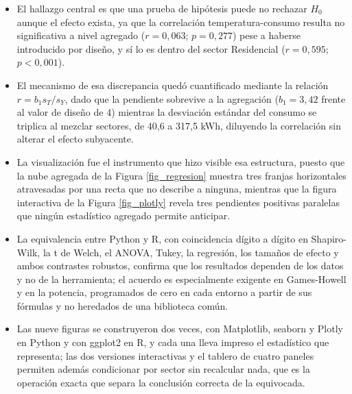 \begin{itemize}
        \vspace{10pt}

        \item El hallazgo central es que una prueba de hipótesis puede no rechazar
        $H_0$ aunque el efecto exista, ya que la correlación temperatura-consumo
        resulta no significativa a nivel agregado ($r = 0{,}063$; $p = 0{,}277$)
        pese a haberse introducido por diseño, y sí lo es dentro del sector
        Residencial ($r = 0{,}595$; $p < 0{,}001$).

        \vspace{10pt}

        \item El mecanismo de esa discrepancia quedó cuantificado mediante la
        relación $r = b_1 s_T / s_Y$, dado que la pendiente sobrevive a la
        agregación ($b_1 = 3{,}42$ frente al valor de diseño de 4) mientras la
        desviación estándar del consumo se triplica al mezclar sectores, de 40,6 a
        317,5 kWh, diluyendo la correlación sin alterar el efecto subyacente.

        \vspace{10pt}

        \item La visualización fue el instrumento que hizo visible esa estructura,
        puesto que la nube agregada de la Figura \ref{fig_regresion} muestra tres
        franjas horizontales atravesadas por una recta que no describe a ninguna,
        mientras que la figura interactiva de la Figura \ref{fig_plotly} revela tres
        pendientes positivas paralelas que ningún estadístico agregado permite
        anticipar.

        \vspace{10pt}

        \item La equivalencia entre Python y R, con coincidencia dígito a dígito en
        Shapiro-Wilk, la t de Welch, el ANOVA, Tukey, la regresión, los tamaños de
        efecto y ambos contrastes robustos, confirma que los resultados dependen de
        los datos y no de la herramienta; el acuerdo es especialmente exigente en
        Games-Howell y en la potencia, programados de cero en cada entorno a partir
        de sus fórmulas y no heredados de una biblioteca común.

        \vspace{10pt}

        \item Las nueve figuras se construyeron dos veces, con Matplotlib, seaborn y
        Plotly en Python y con ggplot2 en R, y cada una lleva impreso el estadístico
        que representa; las dos versiones interactivas y el tablero de cuatro paneles
        permiten además condicionar por sector sin recalcular nada, que es la
        operación exacta que separa la conclusión correcta de la equivocada.
    \end{itemize}
